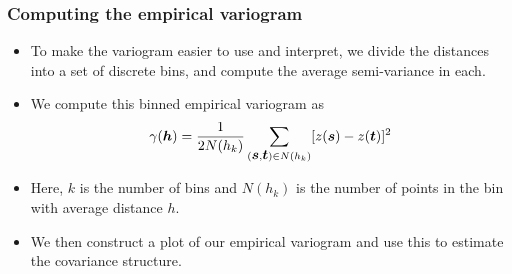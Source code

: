 \documentclass[parskip,12pt]{beamer}
\newcommand{\bd}[1]{\ensuremath{\mbox{\boldmath $#1$}}}
\begin{document}
\begin{frame}
\frametitle{Computing the empirical variogram}
 \begin{itemize}
\item To make the variogram easier to use and interpret, we divide the distances into a set of discrete bins, and compute the average semi-variance in each.
\vspace{3mm}
\item We compute this binned empirical variogram as $$\gamma(\bd{h}) = \frac{1}{2N(h_k)}\sum_{(\bd{s},\bd{t}) \in N(h_k)}[z(\bd{s}) - z(\bd{t})]^2$$
\item Here, $k$ is the number of bins and $N(h_k)$ is the number of points in the bin with average distance $h$.
\vspace{3mm}
\item We then construct a plot of our empirical variogram and use this to estimate the covariance structure.
\end{itemize}
\end{frame}
\end{document}
